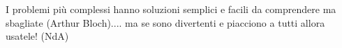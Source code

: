 


\vfill

\begin{enfasi}
{
I problemi più complessi hanno soluzioni semplici e facili da comprendere ma sbagliate (Arthur Bloch).... ma se sono divertenti e piacciono a tutti allora usatele! (NdA)
}
\end{enfasi}


%

\pagebreak
